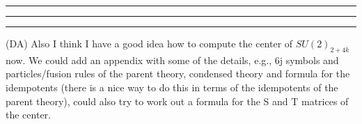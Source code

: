 \documentclass[12pt,a4paper]{article}
\newcounter{arrow}
\newcommand{\dave}[1]{{\color{ao(english)}\footnotesize{(DA) #1}}}
\newcommand{\kwsep}{\bigskip\hrule\medskip\hrule\medskip\hrule\bigskip}
\begin{document}



\kwsep


\dave{Also I think I have a good idea how to compute the center of $SU(2)_{2+4k}$ now. 
We could add an appendix with some of the details, e.g., 6j symbols and particles/fusion rules of the parent theory, condensed theory and formula for the idempotents (there is a nice way to do this in terms of the idempotents of the parent theory), could also try to work out a formula for the S and T matrices of the center.}
\end{document}
